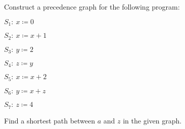 \documentclass[a4paper,12pt]{article}
\begin{document}
\begin{tasks}
    Construct a precedence graph for the following program:
    \par\hspace{2em}$S_1 :~ x \coloneqq 0$
    \par\hspace{2em}$S_2 :~ x \coloneqq x + 1$
    \par\hspace{2em}$S_3 :~ y \coloneqq 2$
    \par\hspace{2em}$S_4 :~ z \coloneqq y$
    \par\hspace{2em}$S_5 :~ x \coloneqq x + 2$
    \par\hspace{2em}$S_6 :~ y \coloneqq x + z$
    \par\hspace{2em}$S_7 :~ z \coloneqq 4$


    \item\label{task:weighted-graph} Find a shortest path between $a$ and $z$ in the given graph.


\end{tasks}
\end{document}
